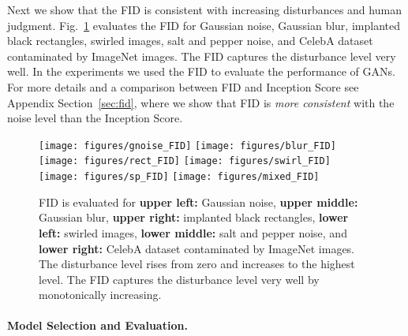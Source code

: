 \documentclass{article}
\begin{document}
Next we show that the FID is consistent with
increasing disturbances and human judgment.
Fig.~\ref{fig:FIDscore} evaluates the FID for Gaussian noise,
Gaussian blur, implanted black rectangles,
swirled images, salt and pepper noise, and
CelebA dataset contaminated by ImageNet images.
The FID captures the disturbance level very well.
In the experiments we used the FID to evaluate the performance of GANs.
For more details and a comparison between FID and Inception Score
see Appendix Section~\ref{sec:fid}, where we show that FID is \textit{more
consistent} with the noise level than the Inception Score.

\begin{figure} \texttt{[image: figures/gnoise\_FID]}
\texttt{[image: figures/blur\_FID]}
\texttt{[image: figures/rect\_FID]}
\texttt{[image: figures/swirl\_FID]}
\texttt{[image: figures/sp\_FID]}
\texttt{[image: figures/mixed\_FID]}
\caption[FID evaluated for different disturbances]{FID is evaluated for {\bf
upper left:} Gaussian noise, {\bf upper middle:} Gaussian blur, {\bf upper right:} implanted black rectangles, {\bf
lower left:} swirled images, {\bf lower middle:} salt and pepper
noise, and {\bf lower right:} CelebA dataset contaminated by
ImageNet images.
The disturbance level rises from zero and increases to the highest
level. The FID captures the disturbance level very well by
monotonically increasing.
  \label{fig:FIDscore} }
\end{figure}

\paragraph{Model Selection and Evaluation.}
\end{document}
